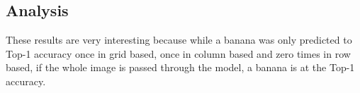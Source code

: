 \subsection*{Analysis}
These results are very interesting because while a banana was only predicted to
Top-1 accuracy once in grid based, once in column based and zero times in row
based, if the whole image is passed through the model, a banana is at the Top-1 accuracy.

























